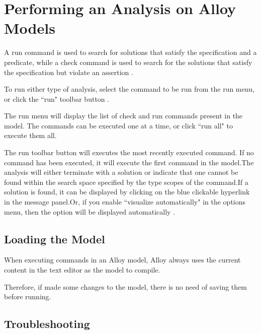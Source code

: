 \documentclass[a4paper,10pt]{report}
\begin{document}
\section{Performing an Analysis on Alloy Models}
\label{Alloy Performance}

A run command is used to search for solutions that satisfy the specification and a predicate, while a check command is used to search for the solutions that satisfy the specification but violate an assertion \cite{DanielJackson}.

To run either type of analysis, select the command to be run from the run menu, or click the ``run" toolbar button \cite{DanielJackson}.

The run menu will display the list of check and run commands present in the model. The commands can be executed one at a time, or click ``run all" to execute them all.

The run toolbar button will executes the most recently executed command. If no command has been executed, it will execute the first command in the model.The analysis will either terminate with a solution or indicate that one cannot be found within the search space specified by the type scopes of the command.If a solution is found, it can be displayed by clicking on the blue clickable hyperlink in the message panel.Or, if you enable ``visualize automatically" in the options menu, then the option will be displayed automatically \cite{DanielJackson}.

\subsection{Loading the Model}
\label{Model loading}

When executing commands in an Alloy model, Alloy always uses the current content in the text editor as the model to compile.

Therefore, if made some changes to the model, there is no need of saving them before running.

\subsection{Troubleshooting}
\label{Troubleshoot}
\end{document}
